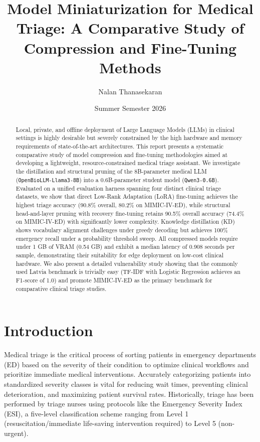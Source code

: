 \documentclass[a4paper, 12pt]{article}
\title{Model Miniaturization for Medical Triage: A Comparative Study of Compression and Fine-Tuning Methods}
\author{Nalan Thanasekaran}
\date{Summer Semester 2026}
\begin{document}
\maketitle

\begin{abstract}
Local, private, and offline deployment of Large Language Models (LLMs) in clinical settings is highly desirable but severely constrained by the high hardware and memory requirements of state-of-the-art architectures. This report presents a systematic comparative study of model compression and fine-tuning methodologies aimed at developing a lightweight, resource-constrained medical triage assistant. We investigate the distillation and structural pruning of the 8B-parameter medical LLM (\texttt{OpenBioLLM-Llama3-8B}) into a 0.6B-parameter student model (\texttt{Qwen3-0.6B}). Evaluated on a unified evaluation harness spanning four distinct clinical triage datasets, we show that direct Low-Rank Adaptation (LoRA) fine-tuning achieves the highest triage accuracy (90.8\% overall, 80.2\% on MIMIC-IV-ED), while structural head-and-layer pruning with recovery fine-tuning retains 90.5\% overall accuracy (74.4\% on MIMIC-IV-ED) with significantly lower complexity. Knowledge distillation (KD) shows vocabulary alignment challenges under greedy decoding but achieves 100\% emergency recall under a probability threshold sweep. All compressed models require under 1 GB of VRAM (0.54 GB) and exhibit a median latency of 0.908 seconds per sample, demonstrating their suitability for edge deployment on low-cost clinical hardware. We also present a detailed vulnerability study showing that the commonly used Latvia benchmark is trivially easy (TF-IDF with Logistic Regression achieves an F1-score of 1.0) and promote MIMIC-IV-ED as the primary benchmark for comparative clinical triage studies.
\end{abstract}

\tableofcontents
\newpage

\section{Introduction}
\label{sec:intro}

Medical triage is the critical process of sorting patients in emergency departments (ED) based on the severity of their condition to optimize clinical workflows and prioritize immediate medical interventions. Accurately categorizing patients into standardized severity classes is vital for reducing wait times, preventing clinical deterioration, and maximizing patient survival rates. Historically, triage has been performed by triage nurses using protocols like the Emergency Severity Index (ESI), a five-level classification scheme ranging from Level 1 (resuscitation/immediate life-saving intervention required) to Level 5 (non-urgent).
\end{document}
